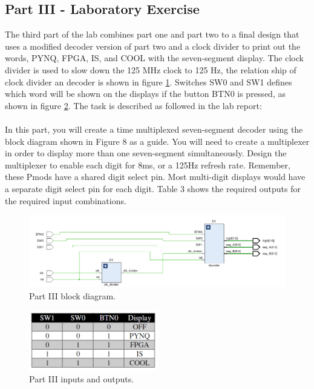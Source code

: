 \subsection{Part III - Laboratory Exercise}\label{subsec: Part III - Laboratory Exercise}
The third part of the lab combines part one and part two to a final design that uses a modified decoder version of part two and a clock divider to print out the words, PYNQ, FPGA, IS, and COOL with the seven-segment display. The clock divider is used to slow down the 125 MHz clock to 125 Hz, the relation ship of clock divider an decoder is shown in figure \ref{fig: Vivado_lab2_part3_block_diagram}. Switches SW0 and SW1 defines which word will be shown on the displays if the button BTN0 is pressed, as shown in figure \ref{fig: Vivado_lab2_part3_InAndOutTable}. The task is described as followed in the lab report: \\   
\\
In this part, you will create a time multiplexed seven-segment decoder using the block diagram shown in Figure
8 as a guide. You will need to create a multiplexer in order to display more than one seven-segment
simultaneously. Design the multiplexer to enable each digit for 8ms, or a 125Hz refresh rate. Remember, these
Pmods have a shared digit select pin. Most multi-digit displays would have a separate digit select pin for each
digit. Table 3 shows the required outputs for the required input combinations.

\begin{figure}[H]
	\centering
	\includegraphics[width=1.0\textwidth]{01_images/Vivado_lab2_part3_block_diagram.PNG}
	\caption{Part III block diagram. \cite{PYNG_RM}}
	\label{fig: Vivado_lab2_part3_block_diagram}
\end{figure}
\begin{figure}[H]
	\centering
	\includegraphics[width=0.5\textwidth]{01_images/Vivado_lab2_part3_InAndOutTable.PNG}
	\caption{Part III inputs and outputs. \cite{PYNG_RM}}
	\label{fig: Vivado_lab2_part3_InAndOutTable}
\end{figure}

